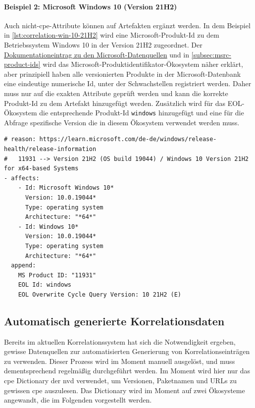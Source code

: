 \paragraph{Beispiel 2: Microsoft Windows 10 (Version 21H2)}
Auch nicht-\acrshort{cpe}-Attribute können auf Artefakten ergänzt werden.
In dem Beispiel in \autoref{lst:correlation-win-10-21H2} wird eine Microsoft-Produkt-Id zu dem Betriebssystem Windows 10 in der Version 21H2 zugeordnet.
Der \href{https://github.com/org-metaeffekt/metaeffekt-documentation/blob/bd184b2889d5421b5a71dcd26c1ac0ffc63d07e7/metaeffekt-vulnerability-management/data-mirror/msrc/understanding-data.md}{Dokumentationeintrag zu den Microsoft-Datenquellen} und in \autoref{subsec:msrc-product-ids} wird das Microsoft-Produktidentifikator-Ökosystem näher erklärt, aber prinzipiell haben alle versionierten Produkte in der Microsoft-Datenbank eine eindeutige numerische Id, unter der Schwachstellen registriert werden.
Daher muss nur auf die exakten Attribute geprüft werden und kann die korrekte Produkt-Id zu dem Artefakt hinzugefügt werden.
Zusätzlich wird für das EOL-Ökosystem die entsprechende Produkt-Id \texttt{windows} hinzugefügt und eine für die Abfrage spezifische Version die in diesem Ökosystem verwendet werden muss.

\begin{lstlisting}[style=yaml,caption={Korrelationseintrag für Windows 10},label={lst:correlation-win-10-21H2}]
# reason: https://learn.microsoft.com/de-de/windows/release-health/release-information
#   11931 --> Version 21H2 (OS build 19044) / Windows 10 Version 21H2 for x64-based Systems
- affects:
    - Id: Microsoft Windows 10*
      Version: 10.0.19044*
      Type: operating system
      Architecture: "*64*"
    - Id: Windows 10*
      Version: 10.0.19044*
      Type: operating system
      Architecture: "*64*"
  append:
    MS Product ID: "11931"
    EOL Id: windows
    EOL Overwrite Cycle Query Version: 10 21H2 (E)
\end{lstlisting}

\subsection{Automatisch generierte Korrelationsdaten}\label{subsec:old-generated-correlation-data}

Bereits im aktuellen Korrelationssystem hat sich die Notwendigkeit ergeben, gewisse Datenquellen zur automatisierten Generierung von Korrelationseinträgen zu verwenden.
Dieser Prozess wird im Moment manuell ausgelöst, und muss dementsprechend regelmäßig durchgeführt werden.
Im Moment wird hier nur das \acrshort{cpe} Dictionary der \acrshort{nvd} verwendet, um Versionen, Paketnamen und URLs zu gewissen \acrshort{cpe} auszulesen.
Das Dictionary wird im Moment auf zwei Ökosysteme angewandt, die im Folgenden vorgestellt werden.

